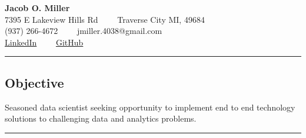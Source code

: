 \documentclass[10pt,letterpaper]{article}
\newenvironment{indentsection}[1]%
{\begin{list}{}%
	{\setlength{\leftmargin}{#1}}%
	\item[]%
}
{\end{list}}
\begin{document}
\thispagestyle{empty}

\begin{center}
{\LARGE \textbf{Jacob O. Miller}}\\

7395 E Lakeview Hills Rd\ \ \textbullet
\ \ Traverse City MI, 49684
\\
(937) 266-4672\ \ \textbullet
\ \ jmiller.4038@gmail.com
\\
\href{https://www.linkedin.com/in/jacob-miller-2ab1b617}{LinkedIn}\ \ \textbullet
\ \ \href{https://github.com/jmiller4038}{GitHub}
\end{center}
\hrule
\vspace{-0.4em}

\subsection*{Objective}

\begin{indentsection}{\parindent}
Seasoned data scientist seeking opportunity to implement end to end technology solutions to challenging data and analytics problems.
\end{indentsection}

\hrule
\vspace{-0.4em}
\end{document}
